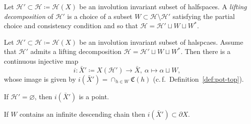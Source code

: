 \begin{defin}
  Let \(\mathcal{H}' \subset \mathcal{H} \coloneqq \mathcal{H}(X)\) be an involution invariant subset of halfspaces. A \emph{lifting decomposition} of \(\mathcal{H}'\) is a choice of a subset \(W \subset \mathcal{H} \setminus \mathcal{H}'\) satisfying the partial choice and consistency condition and so that \(\mathcal{H} = \mathcal{H}' \sqcup W \sqcup W^\ast\).
\end{defin}

\begin{lemma}[{\cite[Lemma~2.6]{MR3509968}}]
  Let \(\mathcal{H}' \subset \mathcal{H} \coloneqq \mathcal{H}(X)\) be an involution invariant subset of halspcaes. Assume that \(\mathcal{H}'\) admits a lifting decomposition \(\mathcal{H} = \mathcal{H}' \sqcup W \sqcup W^\ast\). Then there is a continuous injective map
  \[
    i\colon \bar X' \coloneqq X(\mathcal{H}') \to \bar X,\ \alpha \mapsto \alpha \sqcup W,
  \]
  whose image is given by \(i(\bar X') = \cap_{h \in W} \mathfrak{C}(h)\) (c.\,f.\ Definition~\ref{def:pot-top}).

  If \(\mathcal{H}' = \varnothing\), then \(i(\bar X')\) is a point.

  If \(W\) contains an infinite descending chain then \(i(\bar X') \subset \partial X\).
\end{lemma}

